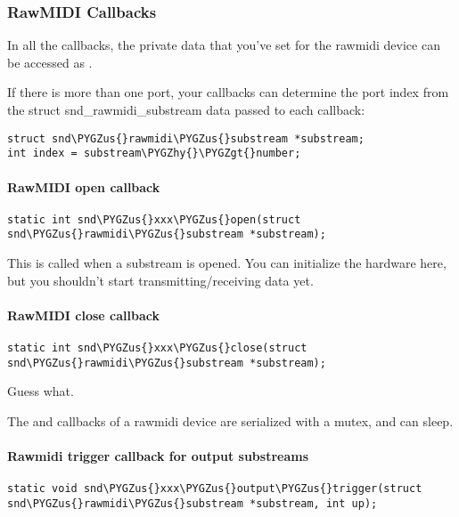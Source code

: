 \documentclass[a4paper,8pt,english]{sphinxmanual}
\def\PYGZus{\char`\_}
\def\PYGZgt{\char`\>}
\def\PYGZhy{\char`\-}
\begin{document}
\subsubsection{RawMIDI Callbacks}
\label{sound/kernel-api/writing-an-alsa-driver:rawmidi-callbacks}
In all the callbacks, the private data that you've set for the rawmidi
device can be accessed as .

If there is more than one port, your callbacks can determine the port
index from the struct snd\_rawmidi\_substream data passed to each
callback:

\begin{Verbatim}[commandchars=\\\{\}]
struct snd\PYGZus{}rawmidi\PYGZus{}substream *substream;
int index = substream\PYGZhy{}\PYGZgt{}number;
\end{Verbatim}


\paragraph{RawMIDI open callback}
\label{sound/kernel-api/writing-an-alsa-driver:rawmidi-open-callback}
\begin{Verbatim}[commandchars=\\\{\}]
static int snd\PYGZus{}xxx\PYGZus{}open(struct snd\PYGZus{}rawmidi\PYGZus{}substream *substream);
\end{Verbatim}

This is called when a substream is opened. You can initialize the
hardware here, but you shouldn't start transmitting/receiving data yet.


\paragraph{RawMIDI close callback}
\label{sound/kernel-api/writing-an-alsa-driver:rawmidi-close-callback}
\begin{Verbatim}[commandchars=\\\{\}]
static int snd\PYGZus{}xxx\PYGZus{}close(struct snd\PYGZus{}rawmidi\PYGZus{}substream *substream);
\end{Verbatim}

Guess what.

The  and  callbacks of a rawmidi device are
serialized with a mutex, and can sleep.


\paragraph{Rawmidi trigger callback for output substreams}
\label{sound/kernel-api/writing-an-alsa-driver:rawmidi-trigger-callback-for-output-substreams}
\begin{Verbatim}[commandchars=\\\{\}]
static void snd\PYGZus{}xxx\PYGZus{}output\PYGZus{}trigger(struct snd\PYGZus{}rawmidi\PYGZus{}substream *substream, int up);
\end{Verbatim}
\end{document}
